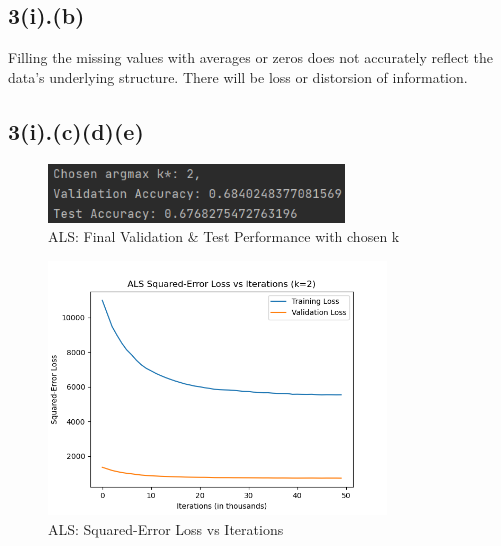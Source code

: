 \documentclass{article}
\begin{document}
\subsection*{3(i).(b)}
Filling the missing values with averages or zeros does not accurately reflect the data's underlying structure. There will be loss or distorsion of information.

\subsection*{3(i).(c)(d)(e)}
\begin{figure}[H]
    \centering
    \includegraphics[width=0.7\textwidth]{3(i)(c)(d).png}
    \caption{ALS: Final Validation \& Test Performance with chosen k\*}
\end{figure}
\begin{figure}[H]
    \centering
    \includegraphics[width=0.8\textwidth]{3(i)(e).png}
    \caption{ALS: Squared-Error Loss vs Iterations}
\end{figure}

\newpage
\end{document}
